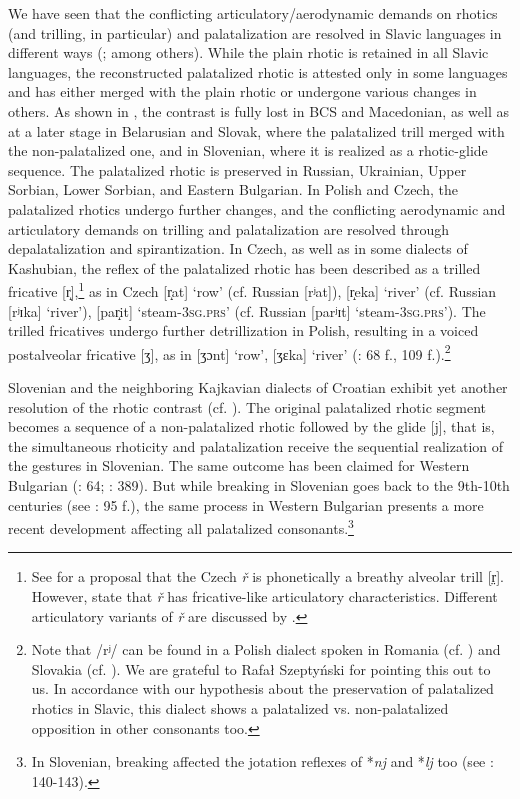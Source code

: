 \documentclass[output=paper]{langscibook}
\begin{document}
\hspace*{-3.3pt}We have seen that the conflicting articulatory/aerodynamic demands on rhotics (and trilling, in particular) and palatalization are resolved in Slavic languages in different ways (\citealt{Kalnyn1961,Stadnik2002,KavitskayaEtAl2009,IskarousKavitskaya2010,Jaworski2018}; among others). While the plain rhotic is retained in all Slavic languages, the reconstructed palatalized rhotic is attested only in some languages and has either merged with the plain rhotic or undergone various changes in others. As shown in , the contrast is fully lost in BCS and Macedonian, as well as at a later stage in Belarusian and Slovak, where the palatalized trill merged with the non-palatalized one, and in Slovenian, where it is realized as a rhotic-glide sequence. The palatalized rhotic is preserved in Russian, Ukrainian, Upper Sorbian, Lower Sorbian, and Eastern Bulgarian. In Polish and Czech, the palatalized rhotics undergo further changes, and the conflicting aerodynamic and articulatory demands on trilling and palatalization are resolved through depalatalization and spirantization. In Czech, as well as in some dialects of Kashubian, the reflex of the palatalized rhotic has been described as a trilled fricative [r̝],\footnote{See \citet{HowsonEtAl2014} for a proposal that the Czech \textit{ř} is phonetically a breathy alveolar trill [r̤]. However, \citet{HowsonEtAl2015} state that \textit{ř} has fricative-like articulatory characteristics. Different articulatory variants of \textit{ř} are discussed by \citet[218-220]{Jaworski2018}.} as in Czech [r̝at] ‘row’ (cf. Russian [rʲat]), [r̝eka] ‘river’ (cf. Russian [rʲɪka] ‘river’),  [par̝it] ‘steam-\textsc{3sg.prs}’ (cf. Russian [parʲɪt] ‘steam-\textsc{3sg.prs}’). The trilled fricatives undergo further detrillization in Polish, resulting in a voiced postalveolar fricative [ʒ], as in [ʒɔnt] ‘row’, [ʒɛka] ‘river’ (\citealt{Stieber1973}: 68 f., 109 f.).\footnote{Note that /rʲ/ can be found in a Polish dialect spoken in Romania (cf. \citealt[36-39]{Deboveanu1971}) and Slovakia (cf. \citealt{Ramšakova2020}). We are grateful to Rafał Szeptyński for pointing this out to us. In accordance with our hypothesis about the preservation of palatalized rhotics in Slavic, this dialect shows a palatalized vs. non-palatalized opposition in other consonants too.}

Slovenian and the neighboring Kajkavian dialects of Croatian exhibit yet another resolution of the rhotic contrast (cf. \citealt[107--108]{Kalnyn1961}). The original palatalized rhotic segment becomes a sequence of a non-palatalized rhotic followed by the glide [j], that is, the simultaneous rhoticity and palatalization receive the sequential realization of the gestures in Slovenian. The same outcome has been claimed for Western Bulgarian (\citealt{Scatton1983}: 64; \citealt{Stadnik1998}: 389). But while breaking in Slovenian goes back to the 9th{}-10th centuries (see \citealt{Greenberg2000}: 95 f.), the same process in Western Bulgarian presents a more recent development affecting all palatalized consonants.\footnote{In Slovenian, breaking affected the jotation reflexes of *\textit{nj} and *\textit{lj} too (see \citealt{Greenberg2000}: 140-143).}
\end{document}
